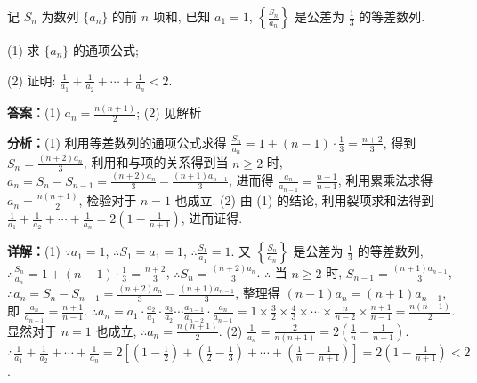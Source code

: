 \begin{question}[points=10]
记 $S_n$ 为数列 $\{a_n\}$ 的前 $n$ 项和, 已知 $a_1 = 1$, $\left\{\frac{S_n}{a_n}\right\}$ 是公差为 $\frac{1}{3}$ 的等差数列.

(1) 求 $\{a_n\}$ 的通项公式;

(2) 证明: $\frac{1}{a_1} + \frac{1}{a_2} + \cdots + \frac{1}{a_n} < 2$.
\begin{solution}
\textbf{答案：}(1) $a_n = \frac{n(n+1)}{2}$; (2) 见解析

\textbf{分析：}(1) 利用等差数列的通项公式求得 $\frac{S_n}{a_n} = 1 + (n-1)\cdot\frac{1}{3} = \frac{n+2}{3}$, 得到 $S_n = \frac{(n+2)a_n}{3}$, 利用和与项的关系得到当 $n \ge 2$ 时, $a_n = S_n - S_{n-1} = \frac{(n+2)a_n}{3} - \frac{(n+1)a_{n-1}}{3}$, 进而得 $\frac{a_n}{a_{n-1}} = \frac{n+1}{n-1}$, 利用累乘法求得 $a_n = \frac{n(n+1)}{2}$, 检验对于 $n=1$ 也成立. (2) 由 (1) 的结论, 利用裂项求和法得到 $\frac{1}{a_1} + \frac{1}{a_2} + \cdots + \frac{1}{a_n} = 2\left(1 - \frac{1}{n+1}\right)$, 进而证得.

\textbf{详解：}(1) $\because a_1 = 1$, $\therefore S_1 = a_1 = 1$, $\therefore \frac{S_1}{a_1} = 1$. 又 $\left\{\frac{S_n}{a_n}\right\}$ 是公差为 $\frac{1}{3}$ 的等差数列, $\therefore \frac{S_n}{a_n} = 1 + (n-1)\cdot\frac{1}{3} = \frac{n+2}{3}$, $\therefore S_n = \frac{(n+2)a_n}{3}$. $\therefore$ 当 $n \ge 2$ 时, $S_{n-1} = \frac{(n+1)a_{n-1}}{3}$, $\therefore a_n = S_n - S_{n-1} = \frac{(n+2)a_n}{3} - \frac{(n+1)a_{n-1}}{3}$, 整理得 $(n-1)a_n = (n+1)a_{n-1}$, 即 $\frac{a_n}{a_{n-1}} = \frac{n+1}{n-1}$. $\therefore a_n = a_1 \cdot \frac{a_2}{a_1} \cdot \frac{a_3}{a_2} \cdots \frac{a_{n-1}}{a_{n-2}} \cdot \frac{a_n}{a_{n-1}} = 1 \times \frac{3}{2} \times \frac{4}{3} \times \cdots \times \frac{n}{n-2} \times \frac{n+1}{n-1} = \frac{n(n+1)}{2}$. 显然对于 $n=1$ 也成立, $\therefore a_n = \frac{n(n+1)}{2}$.
(2) $\frac{1}{a_n} = \frac{2}{n(n+1)} = 2\left(\frac{1}{n} - \frac{1}{n+1}\right)$. $\therefore \frac{1}{a_1} + \frac{1}{a_2} + \cdots + \frac{1}{a_n} = 2\left[\left(1-\frac{1}{2}\right) + \left(\frac{1}{2}-\frac{1}{3}\right) + \cdots + \left(\frac{1}{n} - \frac{1}{n+1}\right)\right] = 2\left(1 - \frac{1}{n+1}\right) < 2$.
\end{solution}
\end{question}

